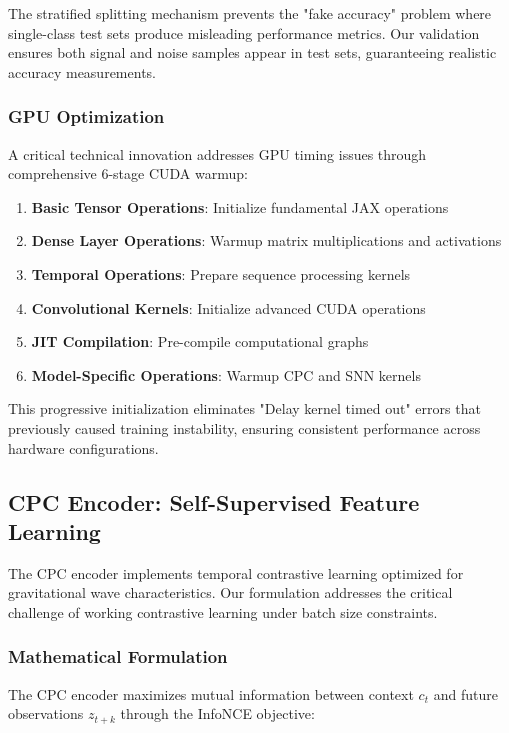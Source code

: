 \documentclass[12pt,a4paper]{article}
\begin{document}
The stratified splitting mechanism prevents the "fake accuracy" problem where single-class test sets produce misleading performance metrics. Our validation ensures both signal and noise samples appear in test sets, guaranteeing realistic accuracy measurements.

\subsubsection{GPU Optimization}

A critical technical innovation addresses GPU timing issues through comprehensive 6-stage CUDA warmup:

\begin{enumerate}
\item \textbf{Basic Tensor Operations}: Initialize fundamental JAX operations
\item \textbf{Dense Layer Operations}: Warmup matrix multiplications and activations
\item \textbf{Temporal Operations}: Prepare sequence processing kernels
\item \textbf{Convolutional Kernels}: Initialize advanced CUDA operations
\item \textbf{JIT Compilation}: Pre-compile computational graphs
\item \textbf{Model-Specific Operations}: Warmup CPC and SNN kernels
\end{enumerate}

This progressive initialization eliminates "Delay kernel timed out" errors that previously caused training instability, ensuring consistent performance across hardware configurations.

\subsection{CPC Encoder: Self-Supervised Feature Learning}

The CPC encoder implements temporal contrastive learning optimized for gravitational wave characteristics. Our formulation addresses the critical challenge of working contrastive learning under batch size constraints.

\subsubsection{Mathematical Formulation}

The CPC encoder maximizes mutual information between context $c_t$ and future observations $z_{t+k}$ through the InfoNCE objective:
\end{document}
